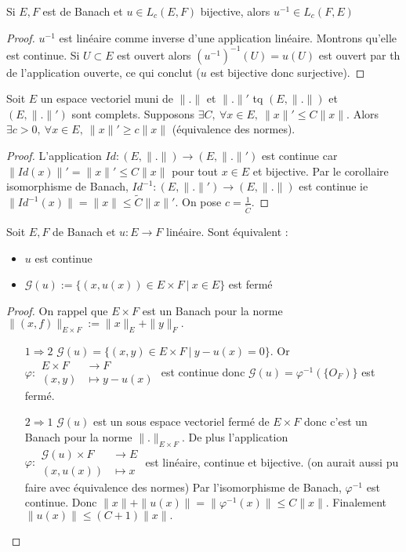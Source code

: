 \begin{corollaire}
    Si $E,F$ est de Banach et $u\in L_c(E,F)$ bijective, alors $u^{-1} \in L_c(F,E)$
\end{corollaire}
\begin{proof}
    $u^{-1} $ est linéaire comme inverse d'une application linéaire. Montrons qu'elle est continue. Si $U\subset E$ est ouvert alors $(u^{-1})^{-1} (U)=u(U) $ est ouvert par th de l'application ouverte, ce qui conclut ($u$ est bijective donc surjective).
\end{proof}
\begin{corollaire}
    Soit $E$ un espace vectoriel muni de $\|.\|$ et $\|.\|'$ tq $(E,\|.\|)$ et $(E,\|.\|')$ sont complets. Supposons $\exists C,\ \forall x\in E,\ \|x\|'\le C\|x\|. $ Alors $\exists c>0,\ \forall x\in E,\ \|x\|'\ge  c\|x\| $ (équivalence des normes).
\end{corollaire}
\begin{proof}
    L'application $Id:(E,\|.\|)\to (E,\|.\|')$ est continue car $\|Id(x)\|'=\|x\|'\le C\|x\|$ pour tout $x\in E$ et bijective. Par le corollaire isomorphisme de Banach, $Id^{-1} : (E,\|.\|')\to (E,\|.\|)$ est continue ie $\|Id^{-1} (x)\|=\|x\|\le \tilde{C}\|x\|'.$ On pose $c=\frac{1}{\tilde{C}}$.
\end{proof}
\begin{theoreme}
    Soit $E,F$ de Banach et $u:E\to F$ linéaire. Sont équivalent :
    \begin{itemize}
        \item $u$ est continue
        \item $\mathcal{G}(u):=\{(x,u(x))\in E\times F\ |\ x\in E\} $ est fermé
    \end{itemize}
\end{theoreme}
\begin{proof}
    On rappel que $E\times F$ est un Banach pour la norme $\|(x,f)\|_{E\times F}:=\|x\|_E+\|y\|_F.$
    \begin{itemize}
        \item[$1\Rightarrow 2$] $\mathcal{G}(u)=\{(x,y)\in E\times F\ |\ y-u(x)=0\} $. Or $\varphi  :\begin{aligned}
            E\times F &\longrightarrow F \\
            (x,y) &\longmapsto y-u(x)
        \end{aligned}$ est continue donc $\mathcal{G}(u)=\varphi ^{-1} (\{O_F)\} $ est fermé.
    \item[$2\Rightarrow 1$] $\mathcal{G}(u)$ est un sous espace vectoriel fermé de $E\times F$ donc c'est un Banach pour la norme $\|.\|_{E\times F}.$ De plus l'application $\varphi : \begin{aligned}
         \mathcal{G}(u)\times F&\longrightarrow E \\
         (x,u(x))&\longmapsto x
    \end{aligned}$ est linéaire, continue et bijective. (on aurait aussi pu faire avec équivalence des normes) Par l'isomorphisme de Banach, $\varphi ^{-1} $ est continue. Donc $\|x\|+\|u(x)\|=\|\varphi ^{-1}  (x)\|\le C\|x\|.$ Finalement $\|u(x)\|\le (C+1)\|x\|.$
    \end{itemize}

\end{proof}
